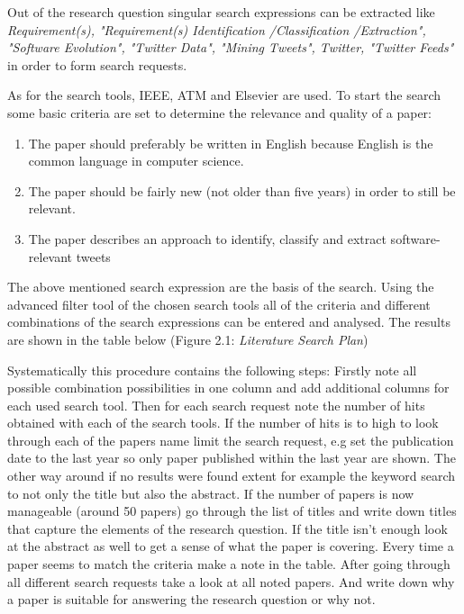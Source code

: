 \documentclass[a4paper,10pt, bibliography=totocnumbered]{scrreprt}
\begin{document}
Out of the research question singular search expressions can be extracted like \textit{Requirement(s), "Requirement(s) Identification /Classification /Extraction", "Software Evolution", "Twitter Data", "Mining Tweets", Twitter, "Twitter Feeds"} in order to form search requests. 

As for the search tools, IEEE, ATM and Elsevier are used.
To start the search some basic criteria are set to determine the relevance and quality of a paper:

\begin{enumerate}
    \item The paper should preferably be written in English because English is the common language in computer science.
    \item The paper should be fairly new (not older than five years) in order to still be relevant.
    \item The paper describes an approach to identify, classify and extract software-relevant tweets
\end{enumerate}

The above mentioned search expression are the basis of the search. Using the advanced filter tool of the chosen search tools all of the criteria and different combinations of the search expressions can be entered and analysed. The results are shown in the table below (Figure 2.1: \textit{Literature Search Plan})

Systematically this procedure contains the following steps: 
Firstly note all possible combination possibilities in one column and add additional columns for each used search tool. Then for each search request note the number of hits obtained with each of the search tools. If the number of hits is to high to look through each of the papers name limit the search request, e.g set the publication date to the last year so only paper published within the last year are shown. The other way around if no results were found extent for example the keyword search to not only the title but also the abstract.
If the number of papers is now manageable (around 50 papers) go through the list of titles and write down titles that capture the elements of the research question. If the title isn't enough look at the abstract as well to get a sense of what the paper is covering. Every time a paper seems to match the criteria make a note in the table. After going through all different search requests take a look at all noted papers. And write down why a paper is suitable for answering the research question or why not. 
\end{document}
